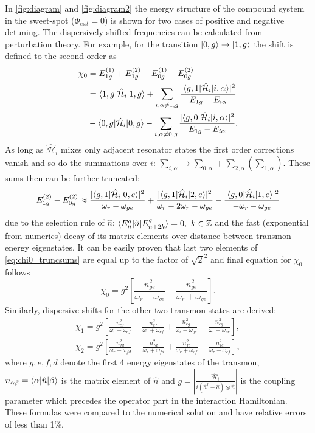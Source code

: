 \documentclass[12pt, twoside]{report}
\DeclarePairedDelimiter\bra{\langle}{\rvert}
\DeclarePairedDelimiter\ket{\lvert}{\rangle}
\newcommand{\sbrkt}[1]{\left[ #1 \right]}
\numberwithin{equation}{section}
\begin{document}
In \autoref{fig:diagram} and \autoref{fig:diagram2} the energy structure of the compound system in the sweet-spot ($\Phi_{ext}=0$) is shown for two cases of positive and negative detuning. The dispersively shifted frequencies can be calculated from perturbation theory. For example, for the transition $\ket{0, g}\rightarrow \ket{1, g}$ the shift is defined to the second order as
\begin{align*}
\chi_0 &=  E_{1g}^{(1)} + E_{1g}^{(2)} - E_{0g}^{(1)} - E_{0g}^{(2)}\\
 &= \bra{1, g}\mathcal{\hat H}_i\ket{1,g} + \sum_{i, \alpha \neq 1, g} \frac{|\bra{g, 1}\mathcal{\hat H}_i\ket{i,\alpha} |^2}{E_{1g} - E_{i\alpha}}\\
 & - \bra{0, g}\mathcal{\hat H}_i\ket{0,g} - \sum_{i, \alpha \neq 0, g} \frac{|\bra{g, 0}\mathcal{\hat H}_i\ket{i,\alpha} |^2}{E_{1g} - E_{i\alpha}}.
\end{align*}
As long as $\mathcal{\hat H}_i$ mixes only adjacent resonator states the first order corrections vanish and so do the summations over $i$: $\sum_{i, \alpha} \rightarrow \sum_{0,\alpha} + \sum_{2,\alpha} (\sum_{1,\alpha})$. These sums then can be further truncated:
\begin{equation}
E_{1g}^{(2)} - E_{0g}^{(2)} \approx \frac{|\bra{g,1}\mathcal{\hat H}_i\ket{0,e}|^2}{\omega_r - \omega_{ge}} + \frac{|\bra{g,1}\mathcal{\hat H}_i\ket{2,e}|^2}{\omega_r - 2\omega_r - \omega_{ge}} -
\frac{|\bra{g,0}\mathcal{\hat H}_i\ket{1,e}|^2}{-\omega_r - \omega_{ge}}\label{eq:chi0_truncsums}
\end{equation} 
due to the selection rule of $\hat n$: $\bra{E^q_n}\hat n \ket{E^q_{n+2k}} = 0,\ k \in \mathbb{Z}$ and the fast (exponential from numerics) decay of its matrix elements over distance between transmon energy eigenstates. It can be easily proven that last two elements of \eqref{eq:chi0_truncsums} are equal up to the factor of $\sqrt{2}^2$ and final equation for $\chi_0$ follows
\begin{equation}
\chi_0 = g^2\sbrkt{\frac{n_{ge}^2}{\omega_r - \omega_{ge}}-\frac{n_{ge}^2}{\omega_r + \omega_{ge}}}.
\end{equation}
Similarly, dispersive shifts for the other two transmon states are derived:
\begin{gather*}
\chi_1 = g^2\sbrkt{\frac{n_{ef}^2}{\omega_r - \omega_{ef}} - \frac{n_{ef}^2}{\omega_r + \omega_{ef}} + \frac{n_{eg}^2}{\omega_r + \omega_{ge}}-\frac{n_{eg}^2}{\omega_r - \omega_{ge} }},\\
\chi_2 = g^2\sbrkt{\frac{n_{fd}^2}{\omega_r - \omega_{fd}} -\frac{n_{fd}^2}{\omega_r + \omega_{fd}} + \frac{n_{fe}^2}{\omega_r + \omega_{ef}}- \frac{n_{fe}^2}{\omega_r -\omega_{ef}}},
\end{gather*}
where $g, e, f, d$ denote the first 4 energy eigenstates of the transmon, $n_{\alpha\beta} = \bra{\alpha} \hat n \ket{\beta}$ is the matrix element of $\hat n$ and $g = \left.|\frac{\mathcal{\hat H}_i}{i(\hat a^\dag  - \hat a)\otimes \hat n}|\right.$ is the coupling parameter which precedes the operator part in the interaction Hamiltonian. These formulas were compared to the numerical solution and have relative errors of less than 1\%.
\end{document}
